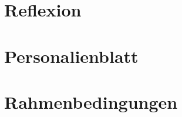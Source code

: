 \documentclass[
11pt, %
a4paper, %
BCOR15mm, %
DIV14, %
footsepline = false, %
headsepline, %
oneside,
openright,
halfparskip, %
abstracton, %
listof=totocnumbered, %
bibliography=totocnumbered %
]{scrreprt}
\begin{document}
  

  \cleardoublepage
  
  
  \chapter{Reflexion}\label{chapter:Reflexion}
  
   
  
  \cleardoublepage
  
  
  \appendix
  
  
  
  \chapter{Personalienblatt}\label{chapter:Personalienblatt}

  
  
  \cleardoublepage
      
  
  \chapter{Rahmenbedingungen}\label{chapter:Rahmenbedingungen}
  
  
  
\end{document}
